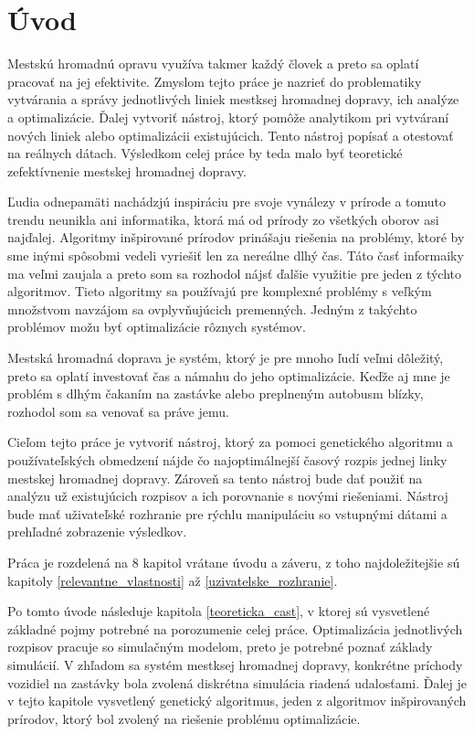 

\chapter{Úvod}
\label{uvod}

Mestskú hromadnú opravu využíva takmer každý človek a preto sa oplatí pracovať na jej efektivite.
Zmyslom tejto práce je nazrieť do problematiky vytvárania a správy jednotlivých liniek mestksej hromadnej dopravy, ich analýze a optimalizácie.
Ďalej vytvoriť nástroj, ktorý pomôže analytikom pri vytváraní nových liniek alebo optimalizácii existujúcich.
Tento nástroj popísať a otestovať na reálnych dátach.
Výsledkom celej práce by teda malo byť teoretické zefektívnenie mestskej hromadnej dopravy.

Ľudia odnepamäti nachádzjú inspiráciu pre svoje vynálezy v prírode a tomuto trendu neunikla ani informatika, ktorá má od prírody zo všetkých oborov asi najďalej.
Algoritmy inšpirované prírodov prinášaju riešenia na problémy, ktoré by sme inými spôsobmi vedeli vyriešiť len za nereálne dlhý čas.
Táto časť informaiky ma veľmi zaujala a preto som sa rozhodol nájsť ďalšie využitie pre jeden z týchto algoritmov.
Tieto algoritmy sa používajú pre komplexné problémy s veľkým množstvom navzájom sa ovplyvňujúcich premenných.
Jedným z takýchto problémov možu byť optimalizácie rôznych systémov.

Mestská hromadná doprava je systém, ktorý je pre mnoho ľudí veľmi dôležitý, preto sa oplatí investovať čas a námahu do jeho optimalizácie.
Keďže aj mne je problém s dlhým čakaním na zastávke alebo preplneným autobusm blízky, rozhodol som sa venovať sa práve jemu.

Cieľom tejto práce je vytvoriť nástroj, ktorý za pomoci genetického algoritmu a používateľských obmedzení nájde čo najoptimálnejší časový rozpis jednej linky mestskej hromadnej dopravy.
Zároveň sa tento nástroj bude dať použiť na analýzu už existujúcich rozpisov a ich porovnanie s novými riešeniami.
Nástroj bude mať uživateľské rozhranie pre rýchlu manipuláciu so vstupnými dátami a prehľadné zobrazenie výsledkov.

Práca je rozdelená na 8 kapitol vrátane úvodu a záveru, z toho najdoležitejšie sú kapitoly \ref{relevantne_vlastnosti} až \ref{uzivatelske_rozhranie}.

Po tomto úvode následuje kapitola \ref{teoreticka_cast}, v ktorej sú vysvetlené základné pojmy potrebné na porozumenie celej práce.
Optimalizácia jednotlivých rozpisov pracuje so simulačným modelom, preto je potrebné poznať základy simulácií.
V zhľadom sa systém mestksej hromadnej dopravy, konkrétne príchody vozidiel na zastávky bola zvolená diskrétna simulácia riadená udalosťami.
Ďalej je v tejto kapitole vysvetlený genetický algoritmus, jeden z algoritmov inšpirovaných prírodov, ktorý bol zvolený na riešenie problému optimalizácie.

